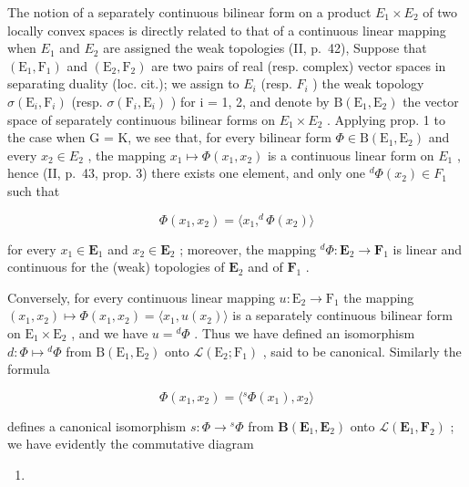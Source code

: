 The notion of a separately continuous bilinear form on a product \(E_{1} \times E_{2}\) of two locally convex spaces is directly related to that of a continuous linear mapping when \(E_{1}\) and \(E_{2}\) are assigned the weak topologies (II, p.~42), Suppose that \((\mathrm{E}_{1}, \mathrm{F}_{1})\) and \((\mathrm{E}_{2}, \mathrm{F}_{2})\) are two pairs of real (resp. complex) vector spaces in separating duality (loc. cit.); we assign to \(E_{i}\) (resp. \(F_{i}\) ) the weak topology \(\sigma(\mathrm{E}_{i}, \mathrm{F}_{i})\) (resp. \(\sigma(\mathrm{F}_{i}, \mathrm{E}_{i})\) ) for i = 1, 2, and denote by \(\mathrm{B}(\mathrm{E}_{1}, \mathrm{E}_{2})\) the vector space of separately continuous bilinear forms on \(E_{1} \times E_{2}\) . Applying prop. 1 to the case when G = K, we see that, for every bilinear form \(\Phi \in \mathrm{B}(\mathrm{E}_{1}, \mathrm{E}_{2})\) and every \(x_{2} \in E_{2}\) , the mapping \(x_{1} \mapsto \Phi(x_{1}, x_{2})\) is a continuous linear form on \(E_{1}\) , hence (II, p.~43, prop. 3) there exists one element, and only one \(^{d}\Phi(x_{2}) \in F_{1}\) such that

\[
\Phi (x _ {1}, x _ {2}) = \langle x _ {1}, ^ {d} \Phi (x _ {2}) \rangle\tag{1}
\]

for every \(x_1 \in \mathbf{E}_1\) and \(x_2 \in \mathbf{E}_2\) ; moreover, the mapping \(^d\Phi: \mathbf{E}_2 \to \mathbf{F}_1\) is linear and continuous for the (weak) topologies of \(\mathbf{E}_2\) and of \(\mathbf{F}_1\) .

Conversely, for every continuous linear mapping \(u: \mathrm{E}_2 \to \mathrm{F}_1\) the mapping \((x_1, x_2) \mapsto \Phi(x_1, x_2) = \langle x_1, u(x_2) \rangle\) is a separately continuous bilinear form on \(\mathrm{E}_1 \times \mathrm{E}_2\) , and we have \(u = {}^d\Phi\) . Thus we have defined an isomorphism \(d: \Phi \mapsto {}^d\Phi\) from \(\mathrm{B}(\mathrm{E}_1, \mathrm{E}_2)\) onto \(\mathcal{L}(\mathrm{E}_2; \mathrm{F}_1)\) , said to be canonical. Similarly the formula

\[
\Phi (x _ {1}, x _ {2}) = \langle {} ^ {s} \Phi (x _ {1}), x _ {2} \rangle\tag{2}
\]

defines a canonical isomorphism \(s: \Phi \to {}^s\Phi\) from \(\mathbf{B}(\mathbf{E}_1, \mathbf{E}_2)\) onto \(\mathcal{L}(\mathbf{E}_1, \mathbf{F}_2)\) ; we have evidently the commutative diagram

\begin{enumerate}
\def\labelenumi{(\arabic{enumi})}
\setcounter{enumi}{2}
\tightlist
\item
\end{enumerate}

